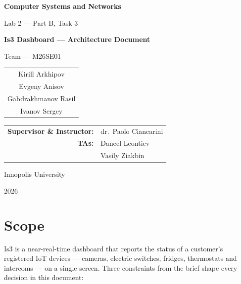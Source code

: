 \documentclass[11pt,a4paper]{article}
\newcommand{\labno}{2}
\newcommand{\doctitle}{Is3 Dashboard --- Architecture Document}
\newcommand{\tasklabel}{Part B, Task 3}
\newcommand{\group}{M26SE01}
\newcommand{\yearofstudy}{2026}
\newcommand{\memberA}{Kirill Arkhipov}
\newcommand{\memberB}{Evgeny Anisov}
\newcommand{\memberC}{Gabdrakhmanov Rasil}
\newcommand{\memberD}{Ivanov Sergey}
\begin{document}
\begin{titlepage}
\centering
\vspace*{2.2cm}

{\LARGE\bfseries Computer Systems and Networks\par}
\vspace{0.6cm}
{\Large Lab \labno{} --- \tasklabel\par}
\vspace{0.5cm}
{\Large\bfseries \doctitle\par}

\vspace{1.8cm}
{\normalsize Team --- \group\par}
\vspace{0.5cm}
\begin{tabular}{c}
\large \memberA \\[4pt]
\large \memberB \\[4pt]
\large \memberC \\[4pt]
\large \memberD \\
\end{tabular}

\vspace{1.8cm}
\begin{tabular}{rl}
\textbf{Supervisor \& Instructor:} & dr.\ Paolo Ciancarini \\[2pt]
\textbf{TAs:}                      & Daneel Leontiev \\[2pt]
                                   & Vasily Ziakbin \\
\end{tabular}

\vfill
{\large Innopolis University\par}
{\large \yearofstudy\par}
\vspace{1.2cm}
\end{titlepage}

\section{Scope}

Is3 is a near-real-time dashboard that reports the status of a customer's registered
IoT devices --- cameras, electric switches, fridges, thermostats and intercoms --- on
a single screen. Three constraints from the brief shape every decision in this
document:
\end{document}
